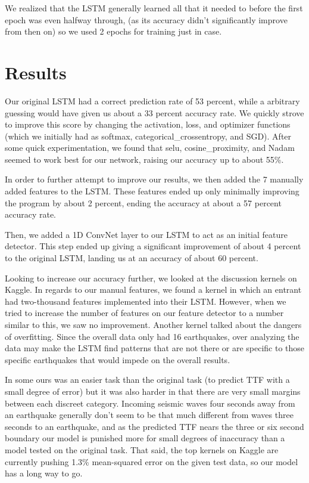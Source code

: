 \documentclass[11pt]{article}
\begin{document}
We realized that the LSTM generally learned all that it needed to before the first epoch was even halfway through, (as its accuracy didn't significantly improve from then on) so we used 2 epochs for training just in case.


\section{Results}

Our original LSTM had a correct prediction rate of 53 percent, while a arbitrary guessing would have given us about a 33 percent accuracy rate. We quickly strove to improve this score by changing the activation, loss, and optimizer functions (which we initially had as softmax, categorical\_crossentropy, and SGD). After some quick experimentation, we found that selu, cosine\_proximity, and Nadam seemed to work best for our network, raising our accuracy up to about 55\%.

In order to further attempt to improve our results, we then added the 7 manually added features to the LSTM. These features ended up only minimally improving the program by about 2 percent, ending the accuracy at about a 57 percent accuracy rate. 

Then, we added a 1D ConvNet layer to our LSTM to act as an initial feature detector. This step ended up giving a significant improvement of about 4 percent to the original LSTM, landing us at an accuracy of about 60 percent. 

Looking to increase our accuracy further, we looked at the discussion kernels on Kaggle. In regards to our manual features, we found a kernel in which an entrant had two-thousand features implemented into their LSTM. However, when we tried to increase the number of features on our feature detector to a number similar to this, we saw no improvement. Another kernel talked about the dangers of overfitting. Since the overall data only had 16 earthquakes, over analyzing the data may make the LSTM find patterns that are not there or are specific to those specific earthquakes that would impede on the overall results.

In some ours was an easier task than the original task (to predict TTF with a small degree of error) but it was also harder in that there
are very small margins between each discreet category. Incoming seismic waves four seconds away from an earthquake generally don't
seem to be that much different from waves three seconds to an earthquake, and as the predicted TTF nears the three or six second boundary
our model is punished more for small degrees of inaccuracy than a model tested on the original task. That said, the top kernels on Kaggle
are currently pushing 1.3\% mean-squared error on the given test data, so our model has a long way to go. 
\end{document}
